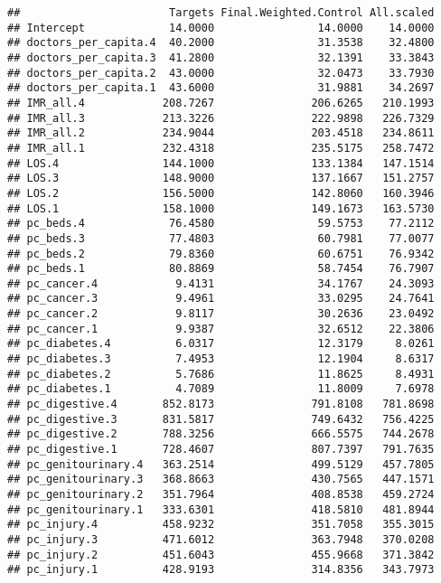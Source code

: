 \documentclass[
]{article}
\begin{document}
\begin{verbatim}
##                       Targets Final.Weighted.Control All.scaled
## Intercept             14.0000                14.0000    14.0000
## doctors_per_capita.4  40.2000                31.3538    32.4800
## doctors_per_capita.3  41.2800                32.1391    33.3843
## doctors_per_capita.2  43.0000                32.0473    33.7930
## doctors_per_capita.1  43.6000                31.9881    34.2697
## IMR_all.4            208.7267               206.6265   210.1993
## IMR_all.3            213.3226               222.9898   226.7329
## IMR_all.2            234.9044               203.4518   234.8611
## IMR_all.1            232.4318               235.5175   258.7472
## LOS.4                144.1000               133.1384   147.1514
## LOS.3                148.9000               137.1667   151.2757
## LOS.2                156.5000               142.8060   160.3946
## LOS.1                158.1000               149.1673   163.5730
## pc_beds.4             76.4580                59.5753    77.2112
## pc_beds.3             77.4803                60.7981    77.0077
## pc_beds.2             79.8360                60.6751    76.9342
## pc_beds.1             80.8869                58.7454    76.7907
## pc_cancer.4            9.4131                34.1767    24.3093
## pc_cancer.3            9.4961                33.0295    24.7641
## pc_cancer.2            9.8117                30.2636    23.0492
## pc_cancer.1            9.9387                32.6512    22.3806
## pc_diabetes.4          6.0317                12.3179     8.0261
## pc_diabetes.3          7.4953                12.1904     8.6317
## pc_diabetes.2          5.7686                11.8625     8.4931
## pc_diabetes.1          4.7089                11.8009     7.6978
## pc_digestive.4       852.8173               791.8108   781.8698
## pc_digestive.3       831.5817               749.6432   756.4225
## pc_digestive.2       788.3256               666.5575   744.2678
## pc_digestive.1       728.4607               807.7397   791.7635
## pc_genitourinary.4   363.2514               499.5129   457.7805
## pc_genitourinary.3   368.8663               430.7565   447.1571
## pc_genitourinary.2   351.7964               408.8538   459.2724
## pc_genitourinary.1   333.6301               418.5810   481.8944
## pc_injury.4          458.9232               351.7058   355.3015
## pc_injury.3          471.6012               363.7948   370.0208
## pc_injury.2          451.6043               455.9668   371.3842
## pc_injury.1          428.9193               314.8356   343.7973

\end{verbatim}
\end{document}
